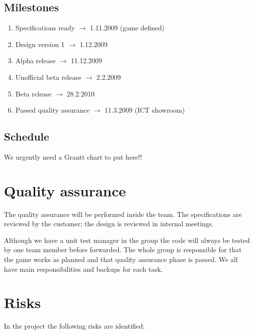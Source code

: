 \documentclass[12pt,a4paper]{article}
\begin{document}
\subsection{Milestones}

\begin{enumerate}
\item Specifications ready
	$\rightarrow$ 1.11.2009 (game defined)
\item Design version 1
	$\rightarrow$ 1.12.2009
\item Alpha release
	$\rightarrow$ 11.12.2009
\item Unofficial beta release
	$\rightarrow$ 2.2.2009 
\item Beta release
	$\rightarrow$ 28.2.2010
\item Passed quality assurance
	$\rightarrow$ 11.3.2009 (ICT  showroom)
\end{enumerate}

\subsection{Schedule}

\begin{todo}
We urgently need a Grantt chart to put here!!
\end{todo}

\section{Quality assurance}

The quality assurance will be performed inside the team. The
specifications are reviewed by the customer; the design is reviewed in
internal meetings.

Although we have a unit test manager in the group the code will always
be tested by one team member before forwarded. The whole group is
responsible for that the game works as planned and that quality
assurance phase is passed. We all have main responsibilities and
backups for each task.

\section{Risks}

In the project the following risks are identified:
\end{document}
